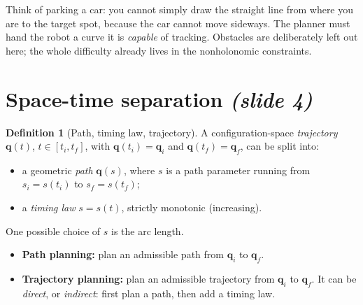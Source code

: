 \documentclass[11pt,a4paper]{article}
\newcommand{\q}{\boldsymbol{q}}
\newcommand{\qi}{\boldsymbol{q}_i}
\newcommand{\qf}{\boldsymbol{q}_f}
\theoremstyle{definition}
\newtheorem{definition}{Definition}[section]
\theoremstyle{plain}
\theoremstyle{remark}
\begin{document}
\begin{intuition}
Think of parking a car: you cannot simply draw the straight line from where you are to the target spot, because the
car cannot move sideways. The planner must hand the robot a curve it is \emph{capable} of tracking.
Obstacles are deliberately left out here; the whole difficulty already lives in the nonholonomic constraints.
\end{intuition}

\section{Space-time separation \emph{(slide 4)}}

\begin{definition}[Path, timing law, trajectory]
A configuration-space \emph{trajectory} $\q(t)$, $t\in[t_i,t_f]$, with $\q(t_i)=\qi$ and $\q(t_f)=\qf$, can be split into:
\begin{itemize}[nosep]
\item a geometric \emph{path} $\q(s)$, where $s$ is a path parameter running from $s_i=s(t_i)$ to $s_f=s(t_f)$;
\item a \emph{timing law} $s=s(t)$, strictly monotonic (increasing).
\end{itemize}
One possible choice of $s$ is the arc length.
\end{definition}

\begin{itemize}
\item \textbf{Path planning:} plan an admissible path from $\qi$ to $\qf$.
\item \textbf{Trajectory planning:} plan an admissible trajectory from $\qi$ to $\qf$. It can be
\emph{direct}, or \emph{indirect}: first plan a path, then add a timing law.
\end{itemize}
\end{document}
